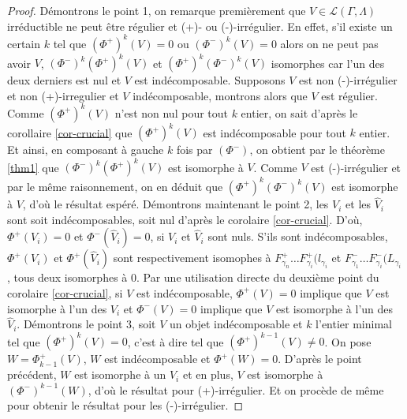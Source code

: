 \documentclass[a4paper,10pt]{article}
\begin{document}
\begin{proof}
  Démontrons le point 1, on remarque premièrement que $V\in \mathscr L(\Gamma,\Lambda)$ irréductible ne peut être régulier et (+)- ou (-)-irrégulier. En effet, s'il existe un certain  $k$ tel que $(\Phi^{+})^{k}(V) = 0$ ou $(\Phi^{-})^{k}(V) = 0$ alors on ne peut pas avoir $V$, $(\Phi^{-})^{k}(\Phi^{+})^{k}(V)$ et $(\Phi^{+})^{k}(\Phi^{-})^{k}(V)$ isomorphes car l'un des deux derniers est nul et $V$ est indécomposable. Supposons $V$ est non (-)-irrégulier et non (+)-irregulier et $V$ indécomposable, montrons alors que $V$ est régulier. Comme $(\Phi^{+})^{k}(V)$ n'est non nul pour tout $k$ entier, on sait d'après le corollaire \ref{cor-crucial} que $(\Phi^{+})^{k}(V)$ est indécomposable pour tout $k$ entier. Et ainsi, en composant à gauche $k$ fois par $(\Phi^{-})$, on obtient par le théorème \ref{thm1} que $(\Phi^{-})^{k}(\Phi^{+})^{k}(V)$ est isomorphe à $V$. Comme $V$ est (-)-irrégulier et par le même raisonnement, on en déduit que $(\Phi^{+})^{k}(\Phi^{-})^{k}(V)$ est isomorphe à $V$, d'où le résultat espéré.
  Démontrons maintenant le point 2, les $V_{i}$ et les $\widehat{V}_{i}$ sont soit indécomposables, soit nul d'après le corolaire \ref{cor-crucial}. D'où, $\Phi^{+}(V_{i}) =0$ et $\Phi^{-}(\widehat{V}_{i})=0$, si $V_{i}$ et $\widehat{V}_{i}$ sont nuls. S'ils sont indécomposables, $\Phi^{+}(V_{i})$ et $\Phi^{+}(\widehat{V}_{i})$ sont respectivement isomophes à $F^{+}_{\gamma_{n}} \dots F^{+}_{\gamma_{i}}(l_{\gamma_{i}}$ et $F^{-}_{\gamma_{1}} \dots F^{-}_{\gamma_{i}}(L_{\gamma_{i}}$, tous deux isomorphes à 0. Par une utilisation directe du deuxième point du corolaire \ref{cor-crucial}, si $V$ est indécomposable, $\Phi^{+}(V) = 0$ implique que $V$ est isomorphe à l'un des $V_{i}$ et  $\Phi^{-}(V)=0$ implique que $V$ est isomorphe à l'un des $\widehat{V}_{i}$.
Démontrons le point 3, soit $V$ un objet indécomposable et $k$ l'entier minimal tel que $(\Phi^{+})^{k}(V) = 0$, c'est à dire tel que $(\Phi^{+})^{k-1}(V) \neq 0$. On pose $W = \Phi^{+}_{k-1}(V)$, $W$ est indécomposable et $\Phi^{+}(W) = 0$. D'après le point précédent, $W$ est isomorphe à un $V_{i}$ et en plus, $V$ est isomorphe à $(\Phi^{-})^{k-1}(W)$, d'où le résultat pour (+)-irrégulier. Et on procède de même pour obtenir le résultat pour les (-)-irrégulier. 
\end{proof}
\clearpage
\end{document}
